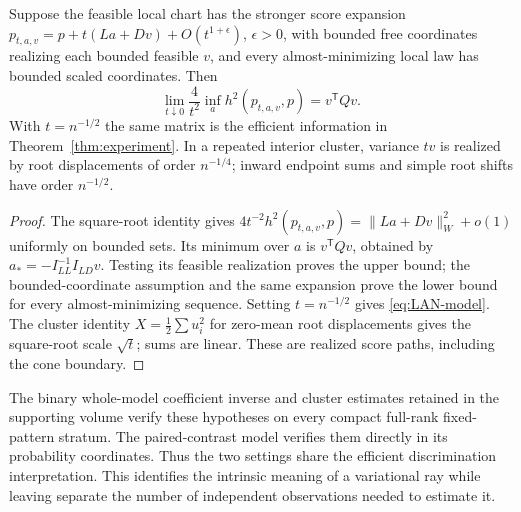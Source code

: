 \begin{corollary}\label{cor:statistical-roots}
Suppose the feasible local chart has the stronger score expansion
$p_{t,a,v}=p+t(La+Dv)+O(t^{1+\epsilon})$, $\epsilon>0$, with bounded free coordinates realizing each bounded feasible $v$, and every almost-minimizing local law has bounded scaled coordinates. Then
\[
 \lim_{t\downarrow0}\frac4{t^2}\inf_a h^2(p_{t,a,v},p)=v^{\mathsf T}Qv.
\]
With $t=n^{-1/2}$ the same matrix is the efficient information in Theorem~\ref{thm:experiment}. In a repeated interior cluster, variance $tv$ is realized by root displacements of order $n^{-1/4}$; inward endpoint sums and simple root shifts have order $n^{-1/2}$.
\end{corollary}
\begin{proof}
The square-root identity gives
$4t^{-2}h^2(p_{t,a,v},p)=\|La+Dv\|_W^2+o(1)$ uniformly on bounded sets. Its minimum over $a$ is $v^{\mathsf T}Qv$, obtained by $a_*=-I_{LL}^{-1}I_{LD}v$. Testing its feasible realization proves the upper bound; the bounded-coordinate assumption and the same expansion prove the lower bound for every almost-minimizing sequence. Setting $t=n^{-1/2}$ gives \eqref{eq:LAN-model}. The cluster identity $X=\frac12\sum u_i^2$ for zero-mean root displacements gives the square-root scale $\sqrt t$; sums are linear. These are realized score paths, including the cone boundary.
\end{proof}
The binary whole-model coefficient inverse and cluster estimates retained in the supporting volume verify these hypotheses on every compact full-rank fixed-pattern stratum. The paired-contrast model verifies them directly in its probability coordinates. Thus the two settings share the efficient discrimination interpretation. This identifies the intrinsic meaning of a variational ray while leaving separate the number of independent observations needed to estimate it.

